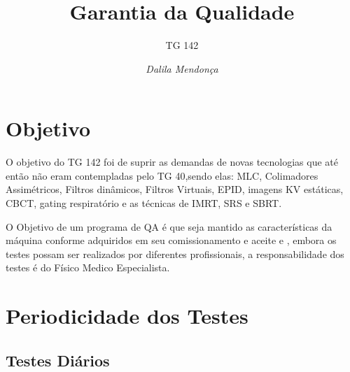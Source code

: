 \documentclass[11pt,a4paper]{article}
\title{Garantia da Qualidade}
\author{TG 142\nocite{*}}
\date{\textit{Dalila Mendonça}}
\begin{document}
	\maketitle


  \section{Objetivo}

    O objetivo do TG 142 foi de suprir as demandas de novas tecnologias que até então não eram contempladas pelo TG 40,sendo elas: MLC, Colimadores Assimétricos, Filtros dinâmicos, Filtros Virtuais, EPID, imagens KV estáticas, CBCT, gating respiratório e as técnicas de IMRT, SRS e SBRT.

    O Objetivo de um programa de QA é que seja mantido as características da máquina conforme adquiridos em seu comissionamento e aceite e , embora os testes possam ser realizados por diferentes profissionais, a responsabilidade dos testes é do Físico Medico Especialista.


  \section{Periodicidade dos Testes}

    \subsection{Testes Diários}
\end{document}
